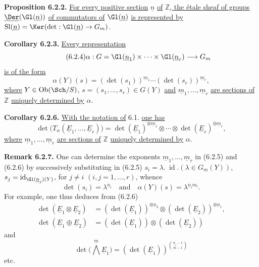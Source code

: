 %

\textbf{Proposition 6.2.2.} \uline{For every positive section} \(\underline{n}\) \uline{of} \(\mathbb Z\)\uline{, the étale sheaf of groups} \(\underline{\Der}(\Gl(\underline{n}))\) \uline{of commutators of} \(\Gl(\underline{n})\) \uline{is represented by}
\(\operatorname{Sl}(\underline{n})=\Ker(\det:\Gl(\underline{n})\to{G}_m)\).

\textbf{Corollary 6.2.3.} \uline{Every representation}
\begin{equation}\tag{6.2.4}
 \alpha:G=\Gl(\underline{n}_1)\times\cdots\times\Gl(\underline{n}_r)\longrightarrow{G}_m
\end{equation}
\uline{is of the form}
\begin{equation}\tag{6.2.5}
 \alpha(Y)(s)=(\det(s_1))^{\underline{m}_1}\cdots(\det(s_r))^{\underline{m}_r},
\end{equation}
\uline{where} \(Y\in\operatorname{Ob}(\Sch/S)\), \(s=(s_1,\ldots,s_r)\in G(Y)\) \uline{and} \(\underline{m}_1,\ldots,\underline{m}_r\) \uline{are sections of} \(\mathbb Z\) \uline{uniquely determined by} \(\alpha\).

\textbf{Corollary 6.2.6.} \uline{With the notation of} 6.1. \uline{one has}
\[
 \det\bigl(T_\alpha(\underline{E}_1,\ldots,\underline{E}_r)\bigr)
 =
 \det(\underline{E}_1)^{\otimes \underline{m}_1}\otimes\cdots\otimes
 \det(\underline{E}_r)^{\otimes \underline{m}_r},
\]
\uline{where} \(\underline{m}_1,\ldots,\underline{m}_r\) \uline{are sections of} \(\mathbb Z\) \uline{uniquely determined by} \(\alpha\).

\textbf{Remark 6.2.7.} One can determine the exponents \(\underline{m}_1,\ldots,\underline{m}_r\) in (6.2.5) and (6.2.6) by successively substituting in (6.2.5)
\(s_i=\lambda.\ \operatorname{id}.(\lambda\in{G}_m(Y))\), \(s_j=\operatorname{id}_{\Gl(\underline{n}_j)(Y)}\), for \(j\ne i\) \((i,j=1,\ldots,r)\), whence
\[
 \det(s_i)=\lambda^{\underline{n}_i}\quad\text{and}\quad
 \alpha(Y)(s)=\lambda^{\underline{n}_im_i}.
\]
For example, one thus deduces from (6.2.6)
\begin{align}
 \det(\underline{E}_1\otimes \underline{E}_2)&=(\det(\underline{E}_1))^{\otimes \underline{n}_2}\otimes(\det(\underline{E}_2))^{\otimes \underline{n}_1}, \tag{6.2.8}\\
 \det(\underline{E}_1\oplus \underline{E}_2)&=(\det(\underline{E}_1))\otimes(\det(\underline{E}_2)) \tag{6.2.9}
\end{align}
and
\begin{equation}\tag{6.2.10}
 \det\bigl(\bigwedge\limits^{\underline{m}} \underline{E}_1\bigr)=(\det(\underline{E}_1))^{\binom{\underline{n}_1-1}{\underline{m}-1}}
\end{equation}
etc.

